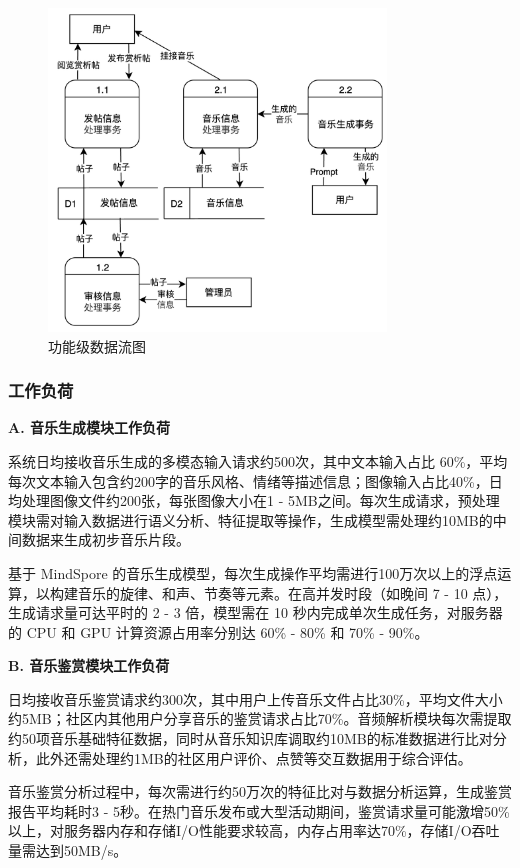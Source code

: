 \documentclass{base}
\numberwithin{figure}{section} %
\begin{document}
\begin{figure}[H]
    \centering
    \includegraphics[width=0.8\textwidth]{images/1-2.png}
    \caption{功能级数据流图}
\end{figure}

\subsubsection{工作负荷}

\textbf{A. 音乐生成模块工作负荷}

系统日均接收音乐生成的多模态输入请求约500次，其中文本输入占比 60\%，平均每次文本输入包含约200字的音乐风格、情绪等描述信息；图像输入占比40\%，日均处理图像文件约200张，每张图像大小在1 - 5MB之间。每次生成请求，预处理模块需对输入数据进行语义分析、特征提取等操作，生成模型需处理约10MB的中间数据来生成初步音乐片段。​

基于 MindSpore 的音乐生成模型，每次生成操作平均需进行100万次以上的浮点运算，以构建音乐的旋律、和声、节奏等元素。在高并发时段（如晚间 7 - 10 点），生成请求量可达平时的 2 - 3 倍，模型需在 10 秒内完成单次生成任务，对服务器的 CPU 和 GPU 计算资源占用率分别达 60\% - 80\% 和 70\% - 90\%。​

\textbf{B. 音乐鉴赏模块工作负荷​}

日均接收音乐鉴赏请求约300次，其中用户上传音乐文件占比30\%，平均文件大小约5MB；社区内其他用户分享音乐的鉴赏请求占比70\%。音频解析模块每次需提取约50项音乐基础特征数据，同时从音乐知识库调取约10MB的标准数据进行比对分析，此外还需处理约1MB的社区用户评价、点赞等交互数据用于综合评估。​

音乐鉴赏分析过程中，每次需进行约50万次的特征比对与数据分析运算，生成鉴赏报告平均耗时3 - 5秒。在热门音乐发布或大型活动期间，鉴赏请求量可能激增50\%以上，对服务器内存和存储I/O性能要求较高，内存占用率达70\%，存储I/O吞吐量需达到50MB/s。​
\end{document}
